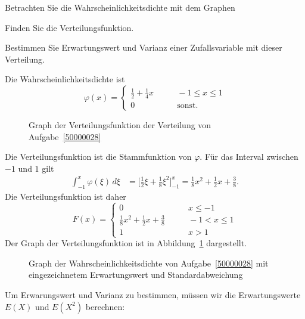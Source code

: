 Betrachten Sie die Wahrscheinlichkeitsdichte mit dem Graphen
\begin{center}
\end{center}
\begin{teilaufgaben}
\item Finden Sie die Verteilungsfunktion.
\item Bestimmen Sie Erwartungswert und Varianz einer Zufallsvariable
mit dieser Verteilung.
\end{teilaufgaben}


\begin{loesung}
Die Wahrscheinlichkeitsdichte ist 
\[
\varphi(x)=\begin{cases}
\frac12+\frac14x&\qquad -1\le x\le 1\\
0&\qquad\text{sonst.}
\end{cases}
\]
\begin{teilaufgaben}
\item
\begin{figure}
\centering
{}
\caption{Graph der Verteilungsfunktion der Verteilung von
Aufgabe~\ref{50000028}
\label{50000028:verteilungsfunktion}}
\end{figure}
Die Verteilungsfunktion ist die Stammfunktion von $\varphi$.
Für das Interval zwischen $-1$ und $1$ gilt
\begin{align*}
\int_{-1}^x\varphi(\xi)\,d\xi
&=
\biggl[\frac12 \xi+\frac18\xi^2\biggr]_{-1}^x
=
\frac18x^2+\frac12x+\frac{3}{8}.
\end{align*}
Die Verteilungsfunktion ist daher
\[
F(x)=\begin{cases}
0&\qquad x \le -1\\
\frac18x^2+\frac12x+\frac{3}{8}
&\qquad -1 < x\le 1\\
1&\qquad x >1
\end{cases}
\]
Der Graph der Verteilungsfunktion ist in
Abbildung~\ref{50000028:verteilungsfunktion} dargestellt.
\item
\begin{figure}
\centering
{}
\caption{Graph der Wahrscheinlichkeitsdichte von Aufgabe~\ref{50000028}
mit eingezeichnetem Erwartungswert und Standardabweichung
\label{50000028:varianz}}
\end{figure}
Um Erwarungswert und Varianz zu bestimmen, müssen wir die Erwartungswerte
$E(X)$ und $E(X^2)$ berechnen:

\end{teilaufgaben}
\end{loesung}
